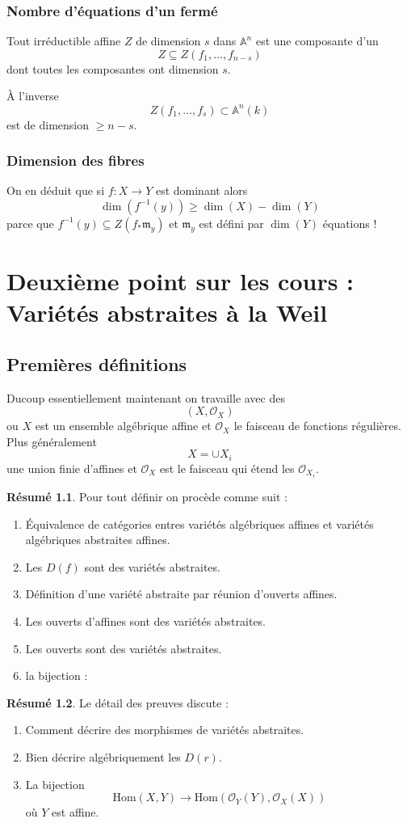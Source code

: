 \documentclass[a4paper,12pt]{book}
\newcommand{\A}{\mathbb{A}}
\newcommand{\Or}{\mathcal{O}}
\newcommand{\Hom}{\textrm{Hom}}
\newcommand{\m}{\mathfrak{m}}
\theoremstyle{plain}
\theoremstyle{definition}
\newtheorem{res}{Résumé}
\theoremstyle{remark}
\begin{document}
\subsection{Nombre d'équations d'un fermé}
Tout irréductible affine $Z$ de dimension $s$ dans $\A^n$ est une 
composante d'un
\[Z\subseteq Z(f_1,\ldots, f_{n-s})\]
dont toutes les composantes ont dimension $s$. 

À l'inverse
\[Z(f_1,\ldots, f_{s})\subset \A^n(k)\]
est de dimension $\geq n-s$.
\subsection{Dimension des fibres}
On en déduit que si $f\colon X\to Y$ est dominant alors
\[\dim(f^{-1}(y))\geq \dim(X)-\dim(Y)\]
parce que $f^{-1}(y)\subseteq Z(f_*\m_y)$ et $\m_y$ est défini
par $\dim(Y)$ équations !
\chapter{Deuxième point sur les cours : Variétés abstraites à la Weil}
\section{Premières définitions}
Ducoup essentiellement maintenant on travaille avec des 
\[(X,\Or_X)\]
ou $X$ est un ensemble algébrique affine et $\Or_X$ le faisceau de
fonctions régulières. Plus généralement
\[X=\cup X_i\]
une union finie d'affines et $\Or_X$ est le faisceau qui étend les 
$\Or_{X_i}$.
\begin{res}
 Pour tout définir on procède comme suit :
    \begin{enumerate}
	\item Équivalence de catégories entres variétés algébriques affines
	    et variétés algébriques abstraites affines.
	\item Les $D(f)$ sont des variétés abstraites.
	\item Définition d'une variété abstraite par réunion d'ouverts 
	    affines.
	\item Les ouverts d'affines sont des variétés abstraites.
	\item Les ouverts sont des variétés abstraites.
	\item la bijection :
    \end{enumerate}
\end{res}
\begin{res}
Le détail des preuves discute :
    \begin{enumerate}
	\item Comment décrire des morphismes de variétés abstraites.
	\item Bien décrire algébriquement les $D(r)$.
	\item La bijection
	    \[\Hom(X,Y)\to \Hom(\Or_Y(Y),\Or_X(X))\]
	    où $Y$ est affine.
    \end{enumerate}
\end{res}
\end{document}
